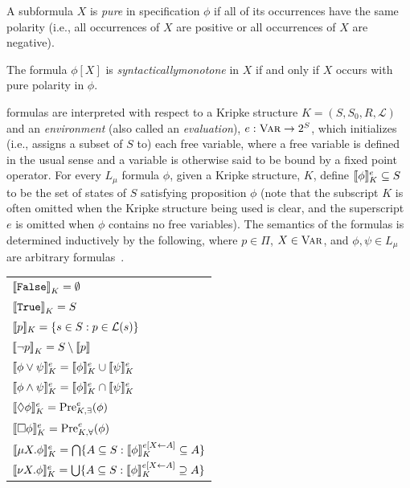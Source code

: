 \begin{defn}
    A subformula $X$ is {\em pure\/} in \mucalc{} specification $\phi$ if all of its occurrences have the same polarity (i.e., all occurrences of $X$ are positive or all occurrences of $X$ are negative).
\end{defn}

\begin{defn}
    The formula $\phi[X]$ is {\em syntactically\/monotone} in $X$ if and only if $X$ occurs with pure polarity in $\phi$.
\end{defn}


\mucalc{} formulas are interpreted with respect to a Kripke structure $K = (S,S_0,R,\mathcal{L})$ and an {\em environment\/} (also called an {\em evaluation\/}), $e: \textsc{Var} \to 2^S$, which initializes (i.e., assigns a subset of $S$ to) each free variable, where a free variable is defined in the usual sense and a variable is otherwise said to be bound by a fixed point operator. For every $L_\mu$ formula $\phi$, given a Kripke structure, $K$, define ${\llbracket}{} \phi {\rrbracket}{}_K^e \subseteq S$ to be the set of states of $S$ satisfying proposition $\phi$ (note that the subscript $K$ is often omitted when the Kripke structure being used is clear, and the superscript $e$ is omitted when $\phi$ contains no free variables). The semantics of the formulas is determined inductively by the following, where $p \in \Pi$, $X \in \textsc{Var}$, and $\phi, \psi \in L_\mu$ are arbitrary formulas~\cite{Wilke2001}.

\begin{tabular}{l}
    ${\llbracket} {\texttt{False}} {\rrbracket}_K = \emptyset$ \\
    ${\llbracket} {\texttt{True}} {\rrbracket}_K = S$ \\
    ${\llbracket}{} p {\rrbracket}{}_K = \{s \in S : p \in \mathcal{L}(s) \}$ \\    
    ${\llbracket} \lnot p {\rrbracket}_K = S \setminus {\llbracket} p {\rrbracket}$ \\
    ${\llbracket}{} \phi \lor \psi {\rrbracket}{}_K^e = {\llbracket}{} \phi {\rrbracket}{}_K^e \cup {\llbracket}{} \psi {\rrbracket}{}_K^e $ \\ 
    ${\llbracket}{} \phi \land \psi {\rrbracket}{}_K^e = {\llbracket}{} \phi {\rrbracket}{}_K^e \cap {\llbracket}{} \psi {\rrbracket}{}_K^e $ \\
    ${\llbracket}{} \Diamond \phi {\rrbracket}{}_K^e = \text{Pre}_{K,\exists}^{e} (\phi)$ \\
    ${\llbracket}{} \square \phi {\rrbracket}{}_K^e = \text{Pre}_{K,\forall}^e (\phi)$ \\
    ${\llbracket}{} \mu X. \phi {\rrbracket}{}_K^e = \bigcap \{ A \subseteq S : {\llbracket}{} \phi {\rrbracket}{}_K^{e[X \leftarrow A]} \subseteq A \}$ \\
    ${\llbracket}{} \nu X. \phi {\rrbracket}{}_K^e = \bigcup \{ A \subseteq S : {\llbracket}{} \phi {\rrbracket}{}_K^{e[X \leftarrow A]} \supseteq A \}$
\end{tabular}

